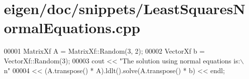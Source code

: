 \hypertarget{eigen_2doc_2snippets_2_least_squares_normal_equations_8cpp_source}{}\section{eigen/doc/snippets/\+Least\+Squares\+Normal\+Equations.cpp}
\label{eigen_2doc_2snippets_2_least_squares_normal_equations_8cpp_source}

\begin{DoxyCode}
00001 MatrixXf A = MatrixXf::Random(3, 2);
00002 VectorXf b = VectorXf::Random(3);
00003 cout << \textcolor{stringliteral}{"The solution using normal equations is:\(\backslash\)n"}
00004      << (A.transpose() * A).ldlt().solve(A.transpose() * b) << endl;
\end{DoxyCode}
